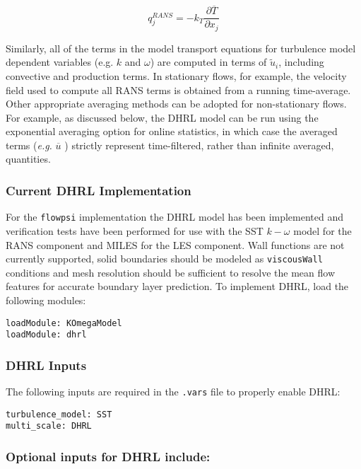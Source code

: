 \begin{equation}
q^{RANS}_j = - k_T \frac{\partial \overline{T}}{\partial x_j}
\end{equation}

Similarly, all of the terms in the model transport equations for
turbulence model dependent variables (e.g. $k$ and $\omega$) are
computed in terms of $\tilde{u}_i$, including convective and
production terms. In stationary flows, for example, the velocity field
used to compute all RANS terms is obtained from a running
time-average. Other appropriate averaging methods can be adopted for
non-stationary flows. For example, as discussed below, the DHRL model
can be run using the exponential averaging option for online
statistics, in which case the averaged terms ({\it e.g.}
$\overline{u}$ ) strictly represent time-filtered, rather than
infinite averaged, quantities.

\subsubsection{Current DHRL Implementation}

For the {\tt flowpsi} implementation the DHRL model has been
implemented and verification tests have been performed for use with
the SST $k-\omega$ model for the RANS component and MILES for the LES
component.  Wall functions are not currently supported, solid
boundaries should be modeled as {\tt viscousWall} conditions and mesh
resolution should be sufficient to resolve the mean flow features for
accurate boundary layer prediction. To implement DHRL, load the
following modules:

\begin{verbatim}
loadModule: KOmegaModel
loadModule: dhrl
\end{verbatim}


\subsubsection{DHRL Inputs}

The following inputs are required in the {\tt .vars} file to properly enable DHRL:

\begin{verbatim}
turbulence_model: SST
multi_scale: DHRL
\end{verbatim}

\subsubsection{Optional inputs for DHRL include:}

